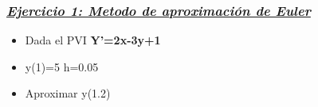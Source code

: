 \documentclass[12 pt,letterpaper]{article}
\begin{document}
\flushleft\subsubsection{\underline{\textit{Ejercicio 1: Metodo de aproximación de Euler}}}\vspace{0.5cm}

   \begin{itemize}
       \item Dada el PVI\hspace{1cm} \textbf{Y’=2x-3y+1}
       \item y(1)=5 \hspace{2cm} h=0.05
       \item Aproximar y(1.2)
   \end{itemize}\leavevmode\newline
\end{document}
